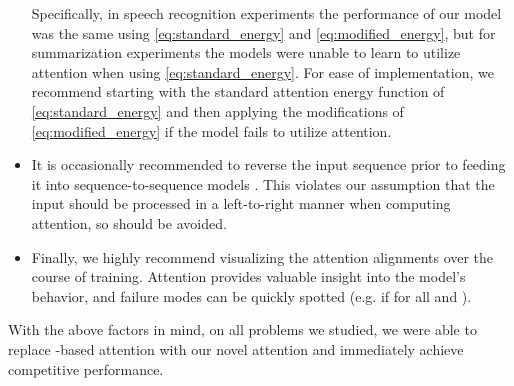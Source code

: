 \documentclass{article}
\begin{document}
\begin{itemize}[leftmargin=*,topsep=0pt,itemsep=-1ex,partopsep=2ex,parsep=2ex]
Specifically, in speech recognition experiments the performance of our model was the same using \cref{eq:standard_energy} and \cref{eq:modified_energy}, but for summarization experiments the models were unable to learn to utilize attention when using \cref{eq:standard_energy}.
For ease of implementation, we recommend starting with the standard attention energy function of \cref{eq:standard_energy} and then applying the modifications of \cref{eq:modified_energy} if the model fails to utilize attention.
\item It is occasionally recommended to reverse the input sequence prior to feeding it into sequence-to-sequence models .
This violates our assumption that the input should be processed in a left-to-right manner when computing attention, so should be avoided.
\item Finally, we highly recommend visualizing the attention alignments  over the course of training.
Attention provides valuable insight into the model's behavior, and failure modes can be quickly spotted (e.g. if  for all  and ).
\end{itemize}
With the above factors in mind, on all problems we studied, we were able to replace -based attention with our novel attention and immediately achieve competitive performance.

\end{document}
